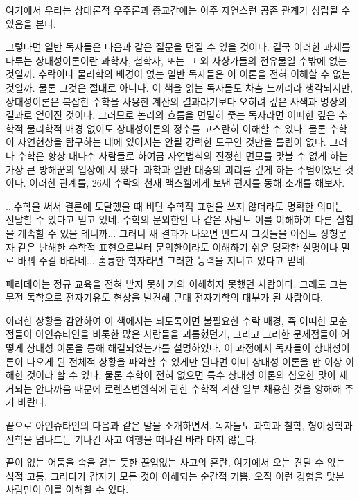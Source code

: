 여기에서 우리는 상대론적 우주론과 종교간에는 아주 자연스런 공존 관계가 성립될 수 있음을
본다.

그렇다면 일반 독자들은 다음과 같은 질문을 던질 수 있을 것이다. 결국 이러한 과제를 다루는
상대성이론이란 과학자, 철학자, 또는 그 외 사상가들의 전유물일 수밖에 없는 것일까. 수락이나
물리학의 배경이 없는 일반 독자들은 이 이론을 전혀 이해할 수 없는 것일까. 물론 그것은
절대로 아니다. 이 책을 읽는 독자들도 차츰 느끼리라 생각되지만, 상대성이론은 복잡한 수학을
사용한 계산의 결과라기보다 오히려 깊은 사색과 명상의 결과로 얻어진 것이다. 그러므로
논리의 흐름을 면밀히 좇는 독자라면 어떠한 깊은 수학적 물리학적 배경 없이도 상대성이론의
정수를 고스란히 이해할 수 있다. 물론 수학이 자연현상을 탐구하는 데에 있어서는 안될 강력한
도구인 것만을 틀림이 없다. 그러나 수학은 항상 대다수 사람들로 하여금 자연법칙의 진정한
면모를 맛볼 수 없게 하는 가장 큰 방해꾼의 입장에 서 왔다. 과학과 일반 대중의 괴리를 깊게
하는 주범이었던 것이다. 이러한 관계를, 26세 수락의 천재 맥스웰에게 보낸 편지를 동해 소개를
해보자.

\beginemph
...수학을 써서 결론에 도달했을 때 비단 수학적 표현을 쓰지 않더라도 명확한 의미는 전달할
수 있다고 믿고 있네. 수학의 문외한인 나 같은 사람도 이를 이해하여 다른 실험을 계속할 수
있을 테니까... 그러니 새 결과가 나오면 반드시 그것들을 이집트 상형문자 같은 난해한 수학적
표현으로부터 문외한이라도 이해하기 쉬운 명확한 설명이나 말로 바꿔 주길 바라네... 훌륭한
학자라면 그러한 능력을  지니고 있다고 믿네.
\endemph

패러데이는 정규 교육을 전혀 받지 못해 거의 이해하지 못했던 사람이다. 그래도 그는
무전 독학으로 전자기유도 현상을 발견해 근대 전자기학의 대부가 된 사람이다.

이러한 상황을 감안하여 이 책에서는 되도록이면 불필요한 수락 배경, 즉 어떠한 모순 점들이
아인슈타인을 비롯한 많은 사람들을 괴롭혔던가, 그리고 그러한 문제점들이 어떻게 상대성
이론을 통해 해결되었는가를 설명하였다. 이 과정에서 독자들이 상대성이론이 나오게 된 전체적
상황을 파악할 수 있게만 된다면 이미 상대성 이론을 반 이상 이해한 것이라 할 수 있다. 물론
수학이 전혀 없으면 특수 상대성 이론의 심오한 맛이 제거되는  안타까움 때문에 로렌츠변완식에
관한 수학적 계산  일부 채용한 것을 양해해 주기 바란다.

끝으로 아인슈타인의 다음과 같은 말을 소개하면서, 독자들도 과학과 철학, 형이상학과 신학을
넘나드는 기나긴 사고 여행을 떠나길 바라 마지 않는다.

\beginemph
끝이 없는 어둠을 속을 걷는 듯한 끊임없는 사고의 혼란, 여기에서 오는 견딜 수 없는 심적
고통, 그러다가 갑자기 모든 것이 이해되는 순간적 기쁨. 오직 이런 경험을 맛본 사람만이 이를
이해할 수 있다.
\endemph
\vfill

